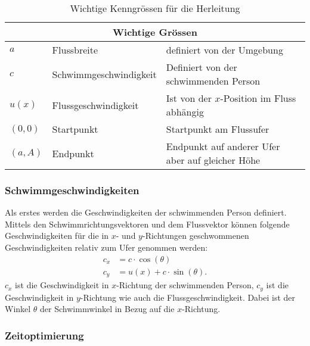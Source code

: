 \begin{table}
    \centering
    \renewcommand{\arraystretch}{1.3}
    \begin{tabularx}{\textwidth}{@{}ll>{\raggedright\arraybackslash}p{7cm}@{}}
        \multicolumn{3}{c}{Wichtige Grössen} \\
        \hline
        \(a\)   &   Flussbreite  &   definiert von der Umgebung \\
        \(c\)   &   Schwimmgeschwindigkeit        &   Definiert von der schwimmenden Person       \\
        \(u(x)\)   &   Flussgeschwindigkeit         &   Ist von der \(x\)-Position im Fluss abhängig     \\
        \((0,0)\)   &   Startpunkt         &   Startpunkt am Flussufer     \\
        \((a,A)\)   &   Endpunkt         &   Endpunkt auf anderer Ufer aber auf gleicher Höhe     \\
	\hline
    \end{tabularx}
    \caption{Wichtige Kenngrössen für die Herleitung}
    \label{table:Wichtige_Kenngroessen}
\end{table}


\subsubsection{Schwimmgeschwindigkeiten}

Als erstes werden die Geschwindigkeiten der schwimmenden Person
definiert. Mittels den Schwimmrichtungsvektoren und dem Flussvektor
können folgende Geschwindigkeiten für die in \(x\)- und \(y\)-Richtungen
geschwommenen Geschwindigkeiten relativ zum Ufer genommen werden:
\begin{align}
    c_x &= c\cdot \cos(\theta) \label{eq:c_x_equation}\\
    c_y &= u(x) + c \cdot \sin(\theta) \label{eq:c_y_equation}.
\end{align}
\(c_x\) ist die Geschwindigkeit in \(x\)-Richtung der schwimmenden
Person, \(c_y\) ist die Geschwindigkeit in \(y\)-Richtung wie auch
die Flussgeschwindigkeit. Dabei ist der Winkel \(\theta\) der
Schwimmwinkel in Bezug auf die \(x\)-Richtung.


\subsubsection{Zeitoptimierung}

